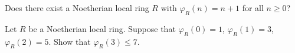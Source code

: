 \begin{exercise}
\label{exercise-hilbert-function-allowed}
Does there exist a Noetherian local ring $R$ with
$\varphi_R(n) = n + 1$ for all $n \geq 0$?
\end{exercise}

\begin{exercise}
\label{exercise-hilbert-function-prohibited}
Let $R$ be a Noetherian local ring.
Suppose that $\varphi_R(0) = 1$, $\varphi_R(1) = 3$,
$\varphi_R(2) = 5$. Show that $\varphi_R(3) \leq 7$.
\end{exercise}




















